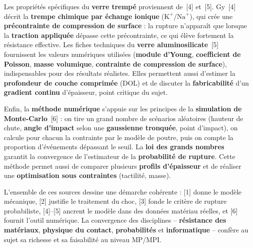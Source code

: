 \documentclass[11pt,a4paper]{article}
\begin{document}
Les propriétés spécifiques du \textbf{verre trempé} proviennent de~[4] et~[5].
Gy~[4] décrit la \textbf{trempe chimique par échange ionique}
($\mathrm{K}^{+}/\mathrm{Na}^{+}$), qui crée une \textbf{précontrainte de
compression de surface} : la rupture n'apparaît que lorsque la \textbf{traction
appliquée} dépasse cette précontrainte, ce qui élève fortement la résistance
effective. Les fiches techniques du \textbf{verre aluminosilicate}~[5]
fournissent les valeurs numériques utilisées (\textbf{module d'Young},
\textbf{coefficient de Poisson}, \textbf{masse volumique}, \textbf{contrainte de
compression de surface}), indispensables pour des résultats réalistes. Elles permettent aussi d'estimer la
\textbf{profondeur de couche comprimée} (DOL) et de discuter la
\textbf{fabricabilité} d'un \textbf{gradient continu} d'épaisseur, point critique
du sujet.

Enfin, la \textbf{méthode numérique} s'appuie sur les principes de la
\textbf{simulation de Monte-Carlo}~[6] : on tire un grand nombre de scénarios
aléatoires (hauteur de chute, \textbf{angle d'impact} selon une
\textbf{gaussienne tronquée}, point d'impact), on calcule pour chacun la
contrainte par le modèle de poutre, puis on compte la proportion d'événements
dépassant le seuil. La \textbf{loi des grands nombres} garantit la convergence
de l'estimateur de la \textbf{probabilité de rupture}. Cette méthode permet
aussi de comparer plusieurs \textbf{profils d'épaisseur} et de réaliser une
\textbf{optimisation sous contraintes} (tactilité, masse).

L'ensemble de ces sources dessine une démarche cohérente : [1] donne le modèle
mécanique, [2] justifie le traitement du choc, [3] fonde le critère de rupture
probabiliste, [4]--[5] ancrent le modèle dans des données matériau réelles, et
[6] fournit l'outil numérique. La convergence des disciplines --
\textbf{résistance des matériaux}, \textbf{physique du contact},
\textbf{probabilités} et \textbf{informatique} -- confère au sujet sa richesse
et sa faisabilité au niveau MP/MPI.

\end{document}
